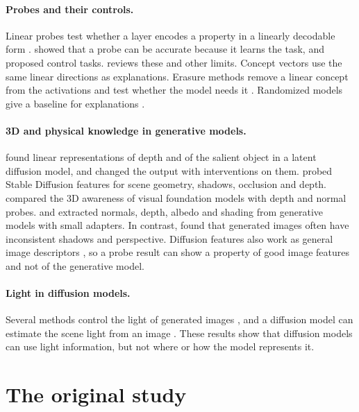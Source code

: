 \documentclass[10pt]{article}
\begin{document}
\paragraph{Probes and their controls.}
Linear probes test whether a layer encodes a property in a linearly decodable form \citep{alain2016probes}.
\citet{hewitt2019control} showed that a probe can be accurate because it learns the task, and proposed control tasks.
\citet{belinkov2022probing} reviews these and other limits.
Concept vectors \citep{kim2018tcav,graziani2018rcv} use the same linear directions as explanations.
Erasure methods remove a linear concept from the activations and test whether the model needs it \citep{ravfogel2020inlp,elazar2021amnesic,belrose2023leace}.
Randomized models give a baseline for explanations \citep{adebayo2018sanity}.

\paragraph{3D and physical knowledge in generative models.}
\citet{chen2023beyond} found linear representations of depth and of the salient object in a latent diffusion model, and changed the output with interventions on them.
\citet{zhan2024protocol} probed Stable Diffusion features for scene geometry, shadows, occlusion and depth.
\citet{elbanani2024probing} compared the 3D awareness of visual foundation models with depth and normal probes.
\citet{du2023generative} and \citet{bhattad2023stylegan} extracted normals, depth, albedo and shading from generative models with small adapters.
In contrast, \citet{sarkar2024shadows} found that generated images often have inconsistent shadows and perspective.
Diffusion features also work as general image descriptors \citep{tang2023dift}, so a probe result can show a property of good image features and not of the generative model.

\paragraph{Light in diffusion models.}
Several methods control the light of generated images \citep{zhang2025iclight,zeng2024dilightnet,kocsis2024lightit}, and a diffusion model can estimate the scene light from an image \citep{phongthawee2024light}.
These results show that diffusion models can use light information, but not where or how the model represents it.

\section{The original study}
\label{sec:original}
\end{document}
